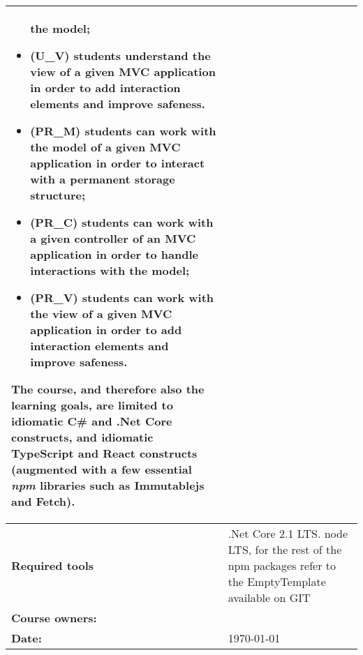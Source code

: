 \begin{tabularx}{\textwidth}{|>{\columncolor{lichtGrijs}} p{}|X|}
\begin{itemize}
the model; 
					\item (U\_V) students understand the view of a given MVC application in order to add interaction elements and improve safeness.
					\item (PR\_M) students can work with the model of a given MVC application in order to interact with a permanent storage structure; 
					\item  (PR\_C) students can work with a given controller of an MVC application in order to handle interactions with
the model; 
					\item (PR\_V) students can work with the view of a given MVC application in order to add interaction elements and improve safeness.
\end{itemize}

The course, and therefore also the learning goals, are limited to
idiomatic C\# and .Net Core constructs, and idiomatic TypeScript and
React constructs (augmented with a few essential \emph{npm} libraries
such as Immutablejs and Fetch).\\
	\hline

	\textbf{Required tools} & .Net Core 2.1 LTS. node LTS, for the rest of the npm packages refer to the EmptyTemplate available on GIT\\ 
	\hline
	\textbf{Course owners:} & \author\\
	\hline
	\textbf{Date:} & \today \\
	\hline
\end{tabularx}
\newpage
